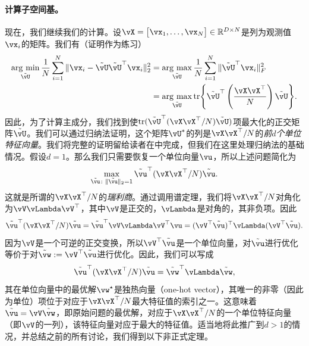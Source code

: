 \documentclass[../../book-main.tex]{subfiles}
\begin{document}
\paragraph{计算子空间基。}
现在，我们继续我们的计算。设\(\vX = \mat{\vx_{1}, \dots, \vx_{N}} \in \R^{D \times N}\)是列为观测值\(\vx_{i}\)的矩阵。我们有（证明作为练习）
\begin{align}
    \argmin_{\tilde{\vU}}\frac{1}{N}\sum_{i = 1}^{N}\norm{\vx_{i} - \tilde{\vU}\tilde{\vU}^{\top}\vx_{i}}_{2}^{2}
    &= \argmax_{\tilde{\vU}}\frac{1}{N}\sum_{i = 1}^{N}\norm{\tilde{\vU}^{\top}\vx_{i}}_{F}^{2} \\ 
    &= \argmax_{\tilde{\vU}}\tr\rc{\tilde{\vU}^{\top}\bp{\frac{\vX\vX^{\top}}{N}}\tilde{\vU}}.
\end{align}
因此，为了计算主成分，我们找到使\(\tr(\tilde{\vU}^{\top}(\vX\vX^{\top}/N)\tilde{\vU})\)项最大化的正交矩阵\(\tilde{\vU}\)。我们可以通过归纳法证明，这个矩阵\(\vU^{\ast}\)的列是\(\vX\vX^{\top}/N\)的\textit{前\(d\)个单位特征向量}。我们将完整的证明留给读者在中完成，但我们在这里处理归纳法的基础情况。假设\(d = 1\)。那么我们只需要恢复一个单位向量\(\vu\)，所以上述问题简化为
\begin{equation}
    \max_{\tilde{\vu} \colon \norm{\tilde{\vu}}_{2} = 1} \tilde{\vu}^{\top}(\vX\vX^{\top}/N)\tilde{\vu}.
\end{equation}
这就是所谓的\(\vX\vX^{\top}/N\)的\textit{瑞利商}。通过调用谱定理，我们将\(\vX\vX^{\top}/N\)对角化为\(\vV\vLambda\vV^{\top}\)，其中\(\vV\)是正交的，\(\vLambda\)是对角的，其非负项。因此
\begin{equation}
    \tilde{\vu}^{\top}(\vX\vX^{\top}/N)\tilde{\vu} = \tilde{\vu}^{\top}\vV\vLambda\vV^{\top}\vu = (\vV^{\top}\tilde{\vu})^{\top}\vLambda(\vV^{\top}\tilde{\vu}).
\end{equation}
因为\(\vV\)是一个可逆的正交变换，所以\(\vV^{\top}\tilde{\vu}\)是一个单位向量，对\(\tilde{\vu}\)进行优化等价于对\(\tilde{\vw} := \vV^{\top}\tilde{\vu}\)进行优化。因此，我们可以写成
\begin{equation}
    \tilde{\vu}^{\top}(\vX\vX^{\top}/N)\tilde{\vu} = \tilde{\vw}^{\top}\vLambda\tilde{\vw},
\end{equation}
其在单位向量中的最优解\(\vw^{\star}\)是独热向量（one-hot vector），其唯一的非零（因此为单位）项位于对应于\(\vX\vX^{\top}/N\)最大特征值的索引之一。这意味着\(\tilde{\vu} = \vV\tilde{\vw}\)，即原始问题的最优解，对应于\(\vX\vX^{\top}/N\)的一个单位特征向量（即\(\vV\)的一列），该特征向量对应于最大的特征值。适当地将此推广到\(d > 1\)的情况，并总结之前的所有讨论，我们得到以下非正式定理。
\end{document}
